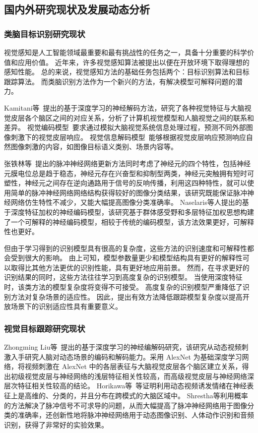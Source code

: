 \documentclass[a4paper,zihao=-4]{article}
\begin{document}
\textcolor{NsfcBlue}{\subsection{国内外研究现状及发展动态分析}}
\subsubsection{类脑目标识别研究现状}
视觉感知是人工智能领域最重要和最有挑战性的任务之一，具备十分重要的科学价值和应用价值。
近年来，许多视觉感知算法被提出以便在开放环境下取得理想的感知性能。
总的来说，视觉感知方法的基础任务包括两个：目标识别算法和目标跟踪算法。
而类脑识别方法作为一个新兴的方法，有解决模型可解释问题的潜力。

Kamitani等~\cite{horikawa2017generic}提出的基于深度学习的神经解码方法，研究了各种视觉特征与大脑视觉皮层各个脑区之间的对应关系，分析了计算机视觉模型和人脑视觉之间的联系和差异。
视觉编码模型~\cite{RN1519}要求通过模拟大脑视觉系统信息处理过程，预测不同外部图像刺激下的视觉皮层响应。
视觉信息解码模型~\cite{decoding_fMRI}能够根据视觉皮层响应预测响应自然图像刺激的内容，如图像目标语义类别、场景内容等。

张铁林等~\cite{zhang2018brain}提出的脉冲神经网络更新方法同时考虑了神经元的四个特性，包括神经元膜电位总是趋于稳态，神经元存在兴奋型和抑制型两类，神经元突触拥有短时可塑性，神经元之间存在逆向通路用于信号的反响传播，利用这四种特性，就可以使用简单的脉冲神经网络网络结构获得较好的图像分类结果，该研究既能保证脉冲神经网络仿生特性不减少，又能大幅提高图像分类准确率。
Naselaris等人\cite{st2018feature}提出的基于深度特征加权的神经编码模型，该研究基于群体感受野和多层特征加权思想构建了一个可解释的神经编码模型，相较于传统的编码模型，该方法效果更好，可解释性也更好。

% 
但由于学习得到的识别模型具有很高的复杂度，这些方法的识别速度和可解释性都会受到很大的影响。
由上可知，模型参数量更少和模型结构具有更好的解释性可以取得比其他方法更优的识别性能，具有更好地应用前景。
然而，在寻求更好的识别结果的同时，这些方法往往学习到高度复杂的识别模型。
当使用深度特征时，该类方法的模型复杂度将变得不可接受。
高度复杂的识别模型严重降低了识别方法对复杂场景的适应性。
因此，提出有效方法降低跟踪模型复杂度以提高开放场景下的识别适应性具有重要意义。


\subsubsection{视觉目标跟踪研究现状}

Zhongming Liu等~\cite{wen2018neural}提出的基于深度学习的神经编解码研究，该研究从动态视频刺激入手研究人脑对动态场景的编码和解码能力。采用 AlexNet 为基础深度学习网络，将视频刺激在 AlexNet 中的各层表征与大脑视觉皮层各个脑区建立关系，得出初级视觉皮层与神经网络的浅层特征相关性较高，而高级视觉皮层与神经网络深层次特征相关性较高的结论。
Horikawa等~\cite{horikawa2020neural}等证明利用动态视频诱发情绪在神经表征上是高维的、分类的，并且分布在跨模式的大脑区域中。
Shrestha等\cite{shrestha2018slayer}利用概率的方法解决了脉冲信号不可求导的问题，从而大幅提高了脉冲神经网络用于图像分类的准确率，还创新性地将脉冲神经网络用于动态图像识别、人体动作识别和音频识别，获得了非常好的实验效果。
\end{document}
